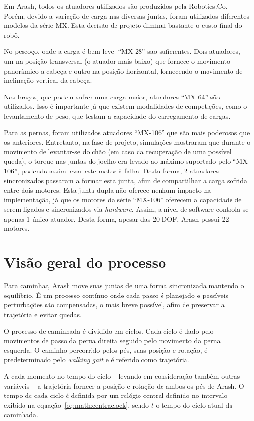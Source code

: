 Em Arash, todos os atuadores utilizados são produzidos pela Robotics.Co. Porém, devido a variação de carga nas diversas juntas, foram utilizados diferentes modelos da série MX. Esta decisão de projeto diminui bastante o custo final do robô.

No pescoço, onde a carga é bem leve, ``MX-28'' são suficientes. Dois atuadores, um na posição transversal (o atuador mais baixo) que fornece o movimento panorâmico a cabeça e outro na posição horizontal, fornecendo o movimento de inclinação vertical da cabeça.

Nos braços, que podem sofrer uma carga maior, atuadores ``MX-64'' são utilizados. Isso é importante já que existem modalidades de competições, como o levantamento de peso, que testam a capacidade do carregamento de cargas.

Para as pernas, foram utilizados atuadores ``MX-106'' que são mais poderosos que os anteriores. Entretanto, na fase de projeto, simulações mostraram que durante o movimento de levantar-se do chão (em caso da recuperação de uma possível queda), o torque nas juntas do joelho era levado ao máximo suportado pelo ``MX-106'', podendo assim levar este motor à falha. Desta forma, 2 atuadores sincronizados passaram a formar esta junta, afim de compartilhar a carga sofrida entre dois motores. Esta junta dupla não oferece nenhum impacto na implementação, já que os motores da série ``MX-106'' oferecem a capacidade de serem ligados e sincronizados via \textit{hardware}. Assim, a nível de software controla-se apenas 1 único atuador. Desta forma, apesar das 20 DOF, Arash possui 22 motores.

\section{Visão geral do processo}

Para caminhar, Arash move suas juntas de uma forma sincronizada mantendo o equilíbrio. É um processo contínuo onde cada passo é planejado e possíveis perturbações são compensadas, o mais breve possível, afim de preservar a trajetória e evitar quedas.

O processo de caminhada é dividido em ciclos. Cada ciclo é dado pelo movimentos de passo da perna direita seguido pelo movimento da perna esquerda. O caminho percorrido pelos pés, suas posição e rotação, é predeterminado pelo \textit{walking gait} e é referido como trajetória.

A cada momento no tempo do ciclo -- levando em consideração também outras variáveis -- a trajetória fornece a posição e rotação de ambos os pés de Arash. O tempo de cada ciclo é definida por um relógio central definido no intervalo exibido na equação~\ref{eq:math:centraclock}, sendo $t$ o tempo do ciclo atual da caminhada.

